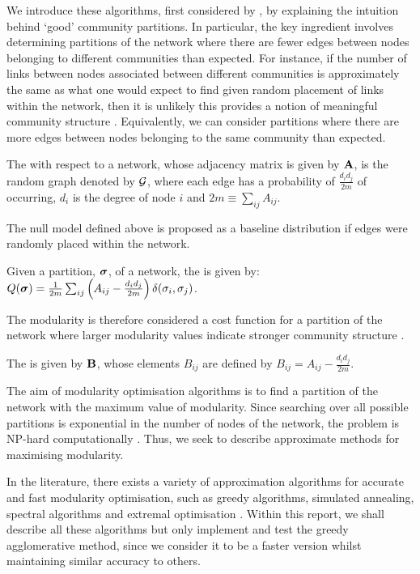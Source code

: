 We introduce these algorithms, first considered by \cite{New06a,New06b}, by explaining the intuition behind `good' community partitions.
In particular, the key ingredient involves determining partitions of the network where there are fewer edges between nodes belonging to different communities than expected.
For instance, if the number of links between nodes associated between different communities is approximately the same as what one would expect to find given random placement of links within the network, then it is unlikely this provides a notion of meaningful community structure \cite{New06b}.
Equivalently, we can consider partitions where there are more edges between nodes belonging to the same community than expected.
\begin{definition}
	\label{def:nullModel}
	The  with respect to a network, whose adjacency matrix is given by  $\mathbf A$, is the random graph denoted by $\mathcal G$, where each edge has a probability of $\frac{d_{i}d_{j}}{2m}$ of occurring, $d_{i}$ is the degree of node $i$ and $2m \equiv \sum_{ij} A_{ij}$.
\end{definition}
The null model defined above is proposed as a baseline distribution if edges were randomly placed within the network.
\begin{definition}
	\label{def:modularity}
	Given a partition, $\vecvar{\sigma}$, of a network, the  is given by: $Q(\vecvar{\sigma}) = \frac{1}{2m} \sum_{ij} \left(A_{ij} - \frac{d_{i}d_{j}}{2m} \right) \delta(\sigma_{i},\sigma_{j})$.
\end{definition}
The modularity is therefore considered a cost function for a partition of the network where larger modularity values indicate stronger community structure \cite{New06a}.
\begin{definition}
	\label{def:modularityMatrix}
	The  is given by $\mathbf B$, whose elements $B_{ij}$ are defined by $B_{ij} = A_{ij} - \frac{d_{i}d_{j}}{2m}$.
\end{definition}
The aim of modularity optimisation algorithms is to find a partition of the network with the maximum value of modularity.
Since searching over all possible partitions is exponential in the number of nodes of the network, the problem is NP-hard computationally \cite{New06b}.
Thus, we seek to describe approximate methods for maximising modularity.

In the literature, there exists a variety of approximation algorithms for accurate and fast modularity optimisation, such as greedy algorithms, simulated annealing, spectral algorithms and extremal optimisation \cite{For10}.
Within this report, we shall describe all these algorithms but only implement and test the greedy agglomerative method, since we consider it to be a faster version whilst maintaining similar accuracy to others.

